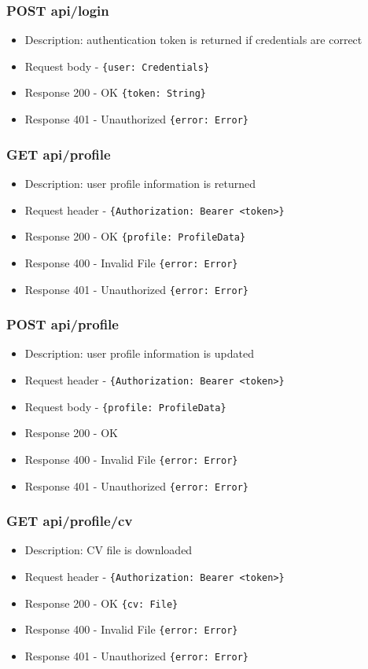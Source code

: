 \subsubsection{POST api/login}
\begin{itemize}
    \item Description: authentication token is returned if credentials are correct
    \item Request body - \verb|{user: Credentials}|
    \item Response 200 - OK \verb|{token: String}|
    \item Response 401 - Unauthorized \verb|{error: Error}|
\end{itemize}

\subsubsection{GET api/profile}
\begin{itemize}
    \item Description: user profile information is returned
    \item Request header - \verb|{Authorization: Bearer <token>}|
    \item Response 200 - OK \verb|{profile: ProfileData}|
    \item Response 400 - Invalid File \verb|{error: Error}|
    \item Response 401 - Unauthorized \verb|{error: Error}|
\end{itemize}

\subsubsection{POST api/profile}
\begin{itemize}
    \item Description: user profile information is updated
    \item Request header - \verb|{Authorization: Bearer <token>}|
    \item Request body - \verb|{profile: ProfileData}|
    \item Response 200 - OK
    \item Response 400 - Invalid File \verb|{error: Error}|
    \item Response 401 - Unauthorized \verb|{error: Error}|
\end{itemize}

\subsubsection{GET api/profile/cv}
\begin{itemize}
    \item Description: CV file is downloaded
    \item Request header - \verb|{Authorization: Bearer <token>}|
    \item Response 200 - OK \verb|{cv: File}|
    \item Response 400 - Invalid File \verb|{error: Error}|
    \item Response 401 - Unauthorized \verb|{error: Error}|
\end{itemize}

